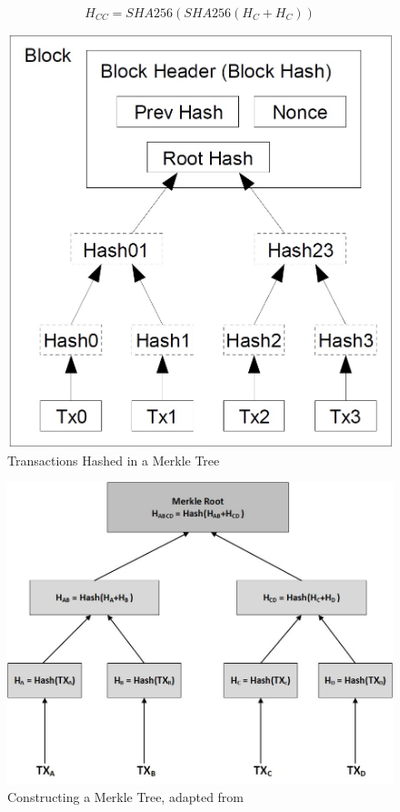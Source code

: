 \begin{equation}
  \label{eq:3}
 H_{CC} = SHA256(SHA256(H_{C} + H_{C}))
\end{equation}


\begin{figure}[h]
	\centering
    \includegraphics[width=120mm,scale=0.5]{figs/blockdisected}
	\caption{Transactions Hashed in a Merkle Tree \cite{paper:001}}
	\label{fig:blockdisected}
\end{figure}
\begin{figure}[h]
	\centering
    \includegraphics[width=160mm,scale=0.5]{figs/mtree}
	\caption{Constructing a Merkle Tree, adapted from \cite{andy_mb}}
	\label{fig:mtree}
\end{figure}
\clearpage

